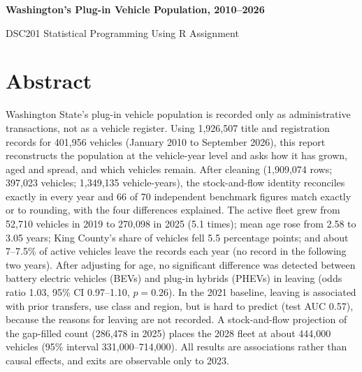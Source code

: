 \documentclass{xmum_asg}
\begin{document}


\pagestyle{empty}
\thispagestyle{empty}

\begin{center}
{\fontsize{14}{17}\selectfont\bfseries Washington's Plug-in Vehicle Population, 2010--2026\par}
\vspace{4pt}
{\normalsize DSC201 Statistical Programming Using R Assignment\par}
\end{center}

\section*{Abstract}

Washington State's plug-in vehicle population is recorded only as administrative transactions, not as a vehicle register. Using 1,926,507 title and registration records for 401,956 vehicles (January 2010 to September 2026), this report reconstructs the population at the vehicle-year level and asks how it has grown, aged and spread, and which vehicles remain. After cleaning (1,909,074 rows; 397,023 vehicles; 1,349,135 vehicle-years), the stock-and-flow identity reconciles exactly in every year and 66 of 70 independent benchmark figures match exactly or to rounding, with the four differences explained. The active fleet grew from 52,710 vehicles in 2019 to 270,098 in 2025 (5.1 times); mean age rose from 2.58 to 3.05 years; King County's share of vehicles fell 5.5 percentage points; and about 7--7.5\% of active vehicles leave the records each year (no record in the following two years). After adjusting for age, no significant difference was detected between battery electric vehicles (BEVs) and plug-in hybrids (PHEVs) in leaving (odds ratio 1.03, 95\% CI 0.97--1.10, $p = 0.26$). In the 2021 baseline, leaving is associated with prior transfers, use class and region, but is hard to predict (test AUC 0.57), because the reasons for leaving are not recorded. A stock-and-flow projection of the gap-filled count (286,478 in 2025) places the 2028 fleet at about 444,000 vehicles (95\% interval 331,000--714,000). All results are associations rather than causal effects, and exits are observable only to 2023.
\end{document}
